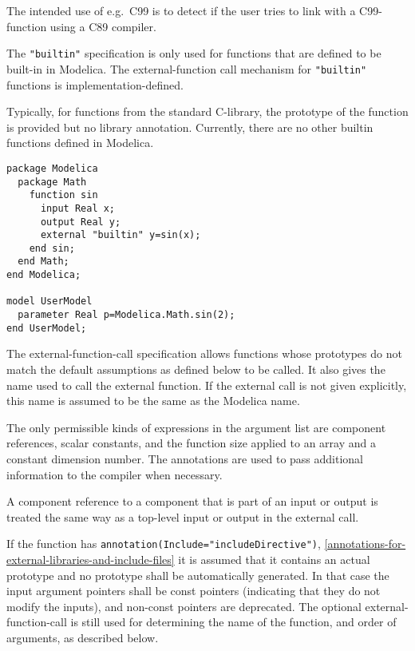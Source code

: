 \begin{nonnormative}
The intended use of e.g.\ C99 is to detect if the user tries to link with a C99-function using a C89 compiler.
\end{nonnormative}

The \lstinline!"builtin"! specification is only used for functions that are defined
to be built-in in Modelica. The external-function call mechanism for
\lstinline!"builtin"! functions is implementation-defined.

\begin{nonnormative}
Typically, for functions from the standard C-library, the prototype of the function is provided but no library annotation. Currently, there are
no other builtin functions defined in Modelica.
\end{nonnormative}

\begin{example}
\begin{lstlisting}[language=modelica]
package Modelica
  package Math
    function sin
      input Real x;
      output Real y;
      external "builtin" y=sin(x);
    end sin;
  end Math;
end Modelica;

model UserModel
  parameter Real p=Modelica.Math.sin(2);
end UserModel;
\end{lstlisting}
\end{example}

The external-function-call specification allows functions whose
prototypes do not match the default assumptions as defined below to be
called. It also gives the name used to call the external function. If
the external call is not given explicitly, this name is assumed to be
the same as the Modelica name.

The only permissible kinds of expressions in the argument list are
component references, scalar constants, and the function size applied to
an array and a constant dimension number. The annotations are used to
pass additional information to the compiler when necessary.

A component reference to a component that is part of an input or output
is treated the same way as a top-level input or output in the external
call.

If the function has \lstinline!annotation(Include="includeDirective")!, \autoref{annotations-for-external-libraries-and-include-files}
it is assumed that it contains an actual prototype and no prototype shall be automatically generated.
In that case the input argument pointers shall be const pointers (indicating that they do not modify the inputs),
and non-const pointers are deprecated.
The optional external-function-call is still used for determining the name of the function, and order of arguments, as described below.

